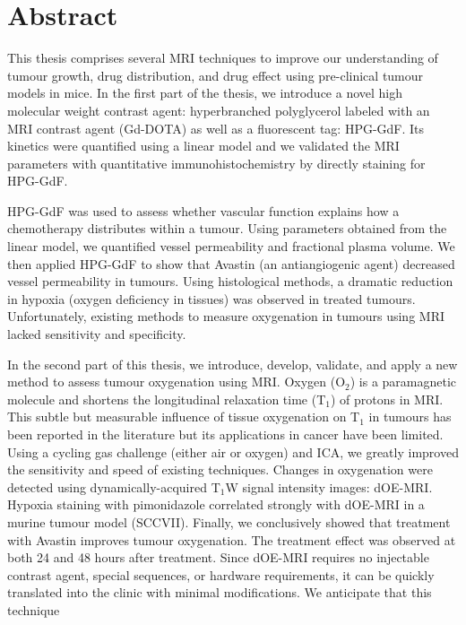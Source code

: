 
\chapter{Abstract}

This thesis comprises several MRI techniques to improve our understanding of tumour growth, drug distribution, and drug effect using pre-clinical tumour models in mice. In the first part of the thesis, we introduce a novel high molecular weight contrast agent: hyperbranched polyglycerol labeled with an MRI contrast agent (Gd-DOTA) as well as a fluorescent tag: HPG-GdF.
Its kinetics were quantified using a linear model and we validated the MRI parameters with quantitative immunohistochemistry by directly staining for HPG-GdF.

HPG-GdF was used to assess whether vascular function explains how a chemotherapy distributes within a tumour. Using parameters obtained from the linear model, we quantified vessel permeability and fractional plasma volume. We then applied HPG-GdF to show that Avastin (an antiangiogenic agent) decreased vessel permeability in tumours. Using histological methods, a dramatic reduction in hypoxia (oxygen deficiency in tissues) was observed in treated tumours. Unfortunately, existing methods to measure oxygenation in tumours using MRI lacked sensitivity and specificity. 

In the second part of this thesis, we introduce, develop, validate, and apply a new method to assess tumour oxygenation using MRI. Oxygen (O$_2$) is a paramagnetic molecule and shortens the longitudinal relaxation time (T$_1$) of protons in MRI. This subtle but measurable influence of tissue oxygenation on T$_1$ in tumours has been reported in the literature but its applications in cancer have been limited. Using a cycling gas challenge (either air or oxygen) and \acs{ICA}, we greatly improved the sensitivity and speed of existing techniques. Changes in oxygenation were detected using dynamically-acquired T$_1$W signal intensity images: \acs{dOE-MRI}. Hypoxia staining with pimonidazole correlated strongly with \acs{dOE-MRI} in a murine tumour model (SCCVII). Finally, we conclusively showed that treatment with Avastin improves tumour oxygenation. The treatment effect was observed at both 24 and 48 hours after treatment. Since \acs{dOE-MRI} requires no injectable contrast agent, special sequences, or hardware requirements, it can be quickly translated into the clinic with minimal modifications. We anticipate that this technique 

